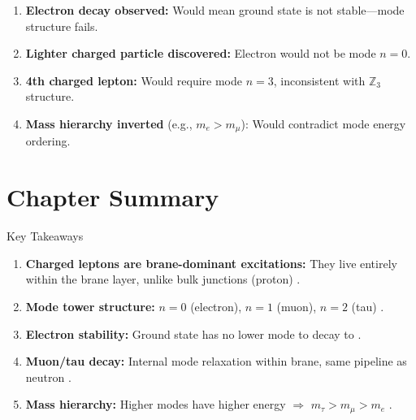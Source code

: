 \begin{tcolorbox}[edcCanonical, title=\textbf{What Would Falsify the Mode Tower Picture}]
\begin{enumerate}
\item \textbf{Electron decay observed:}
      Would mean ground state is not stable---mode structure fails.

\item \textbf{Lighter charged particle discovered:}
      Electron would not be mode $n=0$.

\item \textbf{4th charged lepton:}
      Would require mode $n=3$, inconsistent with $\mathbb{Z}_3$ structure.

\item \textbf{Mass hierarchy inverted} (e.g., $m_e > m_\mu$):
      Would contradict mode energy ordering.
\end{enumerate}
\end{tcolorbox}

\section{Chapter Summary}
\label{sec:lepton_summary}

\begin{statusbox}{Key Takeaways}
\begin{enumerate}
\item \textbf{Charged leptons are brane-dominant excitations:}
      They live entirely within the brane layer, unlike bulk junctions (proton) \tagP{}.

\item \textbf{Mode tower structure:}
      $n = 0$ (electron), $n = 1$ (muon), $n = 2$ (tau) \tagI{}.

\item \textbf{Electron stability:}
      Ground state has no lower mode to decay to \tagDc{}.

\item \textbf{Muon/tau decay:}
      Internal mode relaxation within brane, same pipeline as neutron \tagDc{}.

\item \textbf{Mass hierarchy:}
      Higher modes have higher energy $\Rightarrow$ $m_\tau > m_\mu > m_e$ \tagI{}.
\end{enumerate}
\end{statusbox}

